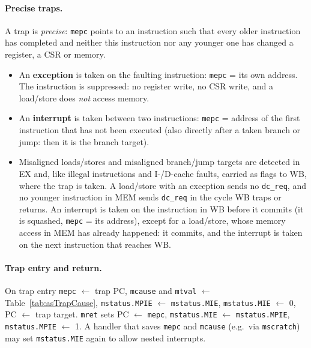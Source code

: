 \paragraph{Precise traps.}
A trap is \emph{precise}: \texttt{mepc} points to an instruction such that
every older instruction has completed and neither this instruction nor any
younger one has changed a register, a CSR or memory.
\begin{itemize}
  \item An \textbf{exception} is taken on the faulting instruction:
    \texttt{mepc} = its own address. The instruction is suppressed: no
    register write, no CSR write, and a load/store does \emph{not} access
    memory.
  \item An \textbf{interrupt} is taken between two instructions:
    \texttt{mepc} = address of the first instruction that has not been
    executed (also directly after a taken branch or jump: then it is the
    branch target).
  \item Misaligned loads/stores and
    misaligned branch/jump targets are detected in EX and, like illegal
    instructions and I-/D-cache faults, carried as flags to WB, where the
    trap is taken. A load/store with an exception sends no
    \texttt{dc\_req}, and no younger instruction in MEM sends
    \texttt{dc\_req} in the cycle WB traps or returns. An interrupt is
    taken on the instruction in WB before it commits (it is squashed,
    \texttt{mepc} = its address), except for a load/store, whose memory
    access in MEM has already happened: it commits, and the interrupt is
    taken on the next instruction that reaches WB.
\end{itemize}

\paragraph{Trap entry and return.}
On trap entry \texttt{mepc} $\leftarrow$ trap PC, \texttt{mcause} and
\texttt{mtval} $\leftarrow$ Table~\ref{tab:asTrapCause},
\texttt{mstatus.MPIE} $\leftarrow$ \texttt{mstatus.MIE},
\texttt{mstatus.MIE} $\leftarrow$ 0, PC $\leftarrow$ trap target.
\texttt{mret} sets PC $\leftarrow$ \texttt{mepc},
\texttt{mstatus.MIE} $\leftarrow$ \texttt{mstatus.MPIE},
\texttt{mstatus.MPIE} $\leftarrow$ 1. A handler that saves \texttt{mepc}
and \texttt{mcause} (e.g.\ via \texttt{mscratch}) may set
\texttt{mstatus.MIE} again to allow nested interrupts.

